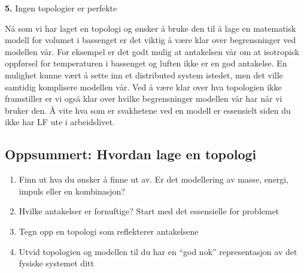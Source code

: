 \begin{center}
    \textbf{5.} Ingen topologier er perfekte
\end{center}

Nå som vi har laget en topologi og ønsker å bruke den til å lage en matematisk modell for volumet i bassenget er det viktig å være klar over begrensninger ved modellen vår. For eksempel er det godt mulig at antakelsen vår om at isotropisk oppførsel for temperaturen i bassenget og luften ikke er en god antakelse. En mulighet kunne vært å sette inn et distributed system istedet, men det ville samtidig komplisere modellen vår. Ved å være klar over hva topologien ikke framstiller er vi også klar over hvilke begrensninger modellen vår har når vi bruker den. Å vite hva som er svakhetene ved en modell er essensielt siden du ikke har LF ute i arbeidslivet. 

\subsection{Oppsummert: Hvordan lage en topologi}
\begin{enumerate}
    \item Finn ut hva du ønsker å finne ut av. Er det modellering av masse, energi, impuls eller en kombinasjon?
    \item Hvilke antakelser er fornuftige? Start med det essensielle for problemet
    \item Tegn opp en topologi som reflekterer antakelsene
    \item Utvid topologien og modellen til du har en \enquote{god nok} representasjon av det fysiske systemet ditt
\end{enumerate}

\clearpage